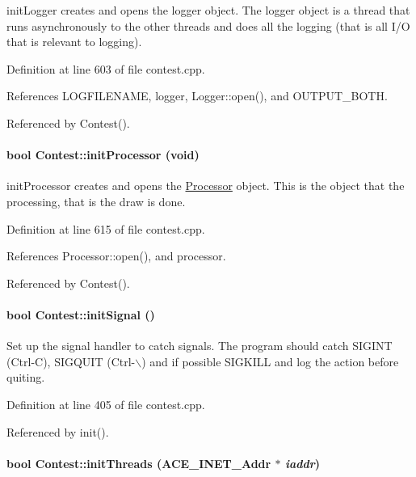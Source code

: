 init\-Logger creates and opens the logger object. The logger object is a thread that runs asynchronously to the other threads and does all the logging (that is all I/O that is relevant to logging). 

Definition at line 603 of file contest.cpp.

References LOGFILENAME, logger, Logger::open(), and OUTPUT\_\-BOTH.

Referenced by Contest().\hypertarget{classContest_Contesta13}{
\paragraph[initProcessor]{\setlength{\rightskip}{0pt plus 5cm}bool Contest::init\-Processor (void)}\hfill}
\label{classContest_Contesta13}


init\-Processor creates and opens the \hyperlink{classProcessor}{Processor} object. This is the object that the processing, that is the draw is done. 

Definition at line 615 of file contest.cpp.

References Processor::open(), and processor.

Referenced by Contest().\hypertarget{classContest_Contesta9}{
\paragraph[initSignal]{\setlength{\rightskip}{0pt plus 5cm}bool Contest::init\-Signal ()}\hfill}
\label{classContest_Contesta9}


Set up the signal handler to catch signals. The program should catch SIGINT (Ctrl-C), SIGQUIT (Ctrl-$\backslash$) and if possible SIGKILL and log the action before quiting. 

Definition at line 405 of file contest.cpp.

Referenced by init().\hypertarget{classContest_Contesta8}{
\paragraph[initThreads]{\setlength{\rightskip}{0pt plus 5cm}bool Contest::init\-Threads (ACE\_\-INET\_\-Addr $\ast$ {\em iaddr})}\hfill}
\label{classContest_Contesta8}


